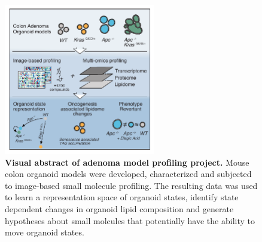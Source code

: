 \begin{flushleft}
\begin{figure}[h]
\centering
\includegraphics[width=250,
                height=\textheight,
                keepaspectratio]{figures/adenomaprofiling/pdf/fig_0_2.pdf}
\caption{\textbf{Visual abstract of adenoma model profiling project.} Mouse colon organoid models were developed, characterized and subjected to image-based small molecule profiling. The resulting data was used to learn a representation space of organoid states, identify state dependent changes in organoid lipid composition and generate hypotheses about small molcules that potentially have the ability to move organoid states.}
\label{fig_a02}
\end{figure}
\bigbreak


\end{flushleft}
